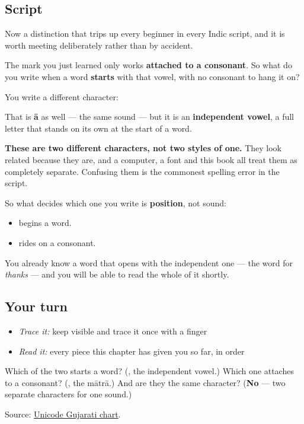 \subsection*{Script}
Now a distinction that trips up every beginner in every Indic script, and it is worth meeting deliberately rather than by accident.

The mark you just learned only works \textbf{attached to a consonant}. So what do you write when a word \textbf{starts} with that vowel, with no consonant to hang it on?

You write a different character:

\begin{quote}
\end{quote}

That is \textbf{ā} as well — the same sound — but it is an \textbf{independent vowel}, a full letter that stands on its own at the start of a word.

\textbf{These are two different characters, not two styles of one.} They look related because they are, and a computer, a font and this book all treat them as completely separate. Confusing them is the commonest spelling error in the script.

So what decides which one you write is \textbf{position}, not sound:

\begin{itemize}
\raggedright
  \item \textbf{} begins a word.
  \item \textbf{} rides on a consonant.
\end{itemize}

You already know a word that opens with the independent one — the word for \emph{thanks} — and you will be able to read the whole of it shortly.

\subsection*{Your turn}
\begin{itemize}
\raggedright
  \item \emph{Trace it:} keep  visible and trace it once with a finger
  \item \emph{Read it:} every piece this chapter has given you so far, in order
\end{itemize}

\begin{tcolorbox}[breakable,colback=teal!4,colframe=teal!35!black,title={Before you move on}]
Which of the two starts a word? (\textbf{}, the independent vowel.) Which one attaches to a consonant? (\textbf{}, the mātrā.) And are they the same character? (\textbf{No} — two separate characters for one sound.)

Source: \href{https://www.unicode.org/charts/PDF/U0A80.pdf}{Unicode Gujarati chart}.
\end{tcolorbox}
